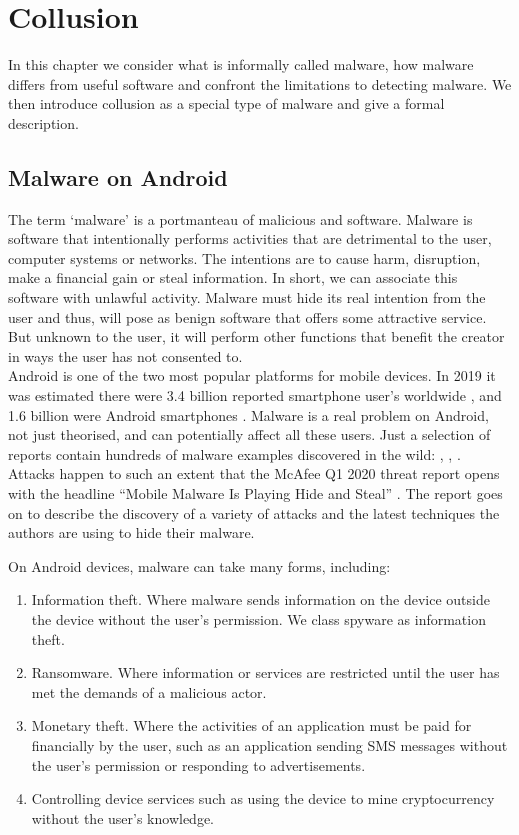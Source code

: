 \chapter{Collusion}
\label{chap:Collusion}

In this chapter we consider what is informally called malware, how malware differs from useful software and confront the limitations to detecting malware.  We then introduce collusion as a special type of malware and give a formal description.

\section{Malware on Android}
The term `malware' is a portmanteau of malicious and software.  Malware is software that intentionally performs activities that are detrimental to the user, computer systems or networks.  The intentions are to cause harm, disruption, make a financial gain or steal information.  In short, we can associate this software with unlawful activity.  Malware must hide its real intention from the user and thus, will pose as benign software that offers some attractive service.  But unknown to the user, it will perform other functions that benefit the creator in ways the user has not consented to.\\

Android is one of the two most popular platforms for mobile devices.  In 2019 it was estimated there were 3.4 billion reported smartphone user's worldwide \cite{SmartphoneUsers2019}, and 1.6 billion were Android smartphones \cite{AndroidUsers2019}.  Malware is a real problem on Android, not just theorised, and can potentially affect all these users.  Just a selection of reports contain hundreds of malware examples discovered in the wild: \cite{GhimobMalware}, \cite{AlienMalware}, \cite{CryloggerInTheWild}.  Attacks happen to such an extent that the McAfee Q1 2020 threat report opens with the headline ``Mobile Malware Is Playing Hide and Steal'' \cite{McAfeeMobileThreatReport}.  The report goes on to describe the discovery of a variety of attacks and the latest techniques the authors are using to hide their malware.

On Android devices, malware can take many forms, including:

\begin{enumerate}
\item Information theft.  Where malware sends information on the device outside the device without the user's permission.  We class spyware as information theft.
\item Ransomware.  Where information or services are restricted until the user has met the demands of a malicious actor.
\item Monetary theft.  Where the activities of an application must be paid for financially by the user, such as an application sending SMS messages without the user's permission or responding to advertisements.
\item Controlling device services such as using the device to mine cryptocurrency without the user's knowledge.
\end{enumerate}

